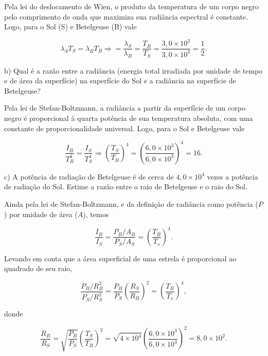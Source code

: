 \begin{enumerate}[start=1,label={\bfseries Q\arabic*.}]
  {\color{red}

  Pela lei do deslocamento de Wien, o produto da temperatura de um corpo negro pelo comprimento de onda que maximiza sua radiância espectral é constante. Logo, para o Sol (S) e Betelgeuse (B) vale

$$
\lambda_{S} T_{S} = \lambda_{B} T_{B} \Rightarrow = \frac{\lambda_{S}}{\lambda_{B}} = \frac{T_{B}}{T_{S}} = \frac{3,0 \times 10^{3}}{3,0 \times 10^{3}} = \frac{1}{2}.
$$


  }


  b) Qual é a razão entre a radiância (energia total irradiada por unidade de tempo e de área da superfície) na superfície do Sol e a radiância na superfície de Betelgeuse?

  {\color{red}

Pela lei de Stefan-Boltzmann, a radiância a partir da superfície de um corpo negro é proporcional à quarta potência de sua temperatura absoluta, com uma constante de proporcionalidade universal. Logo, para o Sol e Betelgeuse vale

$$
\frac{I_{B}}{T_{B}^{4}} = \frac{I_{S}}{T_{S}^{4}} \Rightarrow \left( \frac{T_{S}}{T_{B}}  \right)^{4} = \left( \frac{6,0 \times 10^{3}}{6,0 \times 10^{3}} \right)^{4} = 16.
$$

}


  c) A potência de radiação de Betelgeuse é de cerca de $4,0 \times 10^{4}$ vezes a potência de radiação do Sol. Estime a razão entre o raio de Betelgeuse e o raio do Sol.

  {\color{red}

Ainda pela lei de Stefan-Boltzmann, e da definição de radiância como potência ($P$) por unidade de área ($A$), temos

$$
\frac{I_{B}}{I_{S}} = \frac{P_{B}/A_{B}}{P_{S}/A_{S}} = \left( \frac{T_{B}}{T_{s}}  \right)^{4}.
$$

Levando em conta que a área superficial de uma estrela é proporcional ao quadrado de seu raio,

$$
\frac{P_{B}/R_{B}^{2}}{P_{S}/R_{S}^{2}} = \frac{P_{B}}{P_{S}} \left( \frac{R_{S}}{R_{B}} \right)^{2} = \left( \frac{T_{B}}{T_{s}}  \right)^{4},
$$


donde

$$
\frac{R_{B}}{R_{S}} = \sqrt{\frac{P_{B}}{P_{S}}} \left( \frac{T_{S}}{T_{B}} \right)^{2} = \sqrt{4 \times 10^{4}} \left( \frac{6,0 \times 10^{3}}{6,0 \times 10^{3}}  \right)^{2} = 8,0 \times 10^{2}.
$$

}




\end{enumerate}
